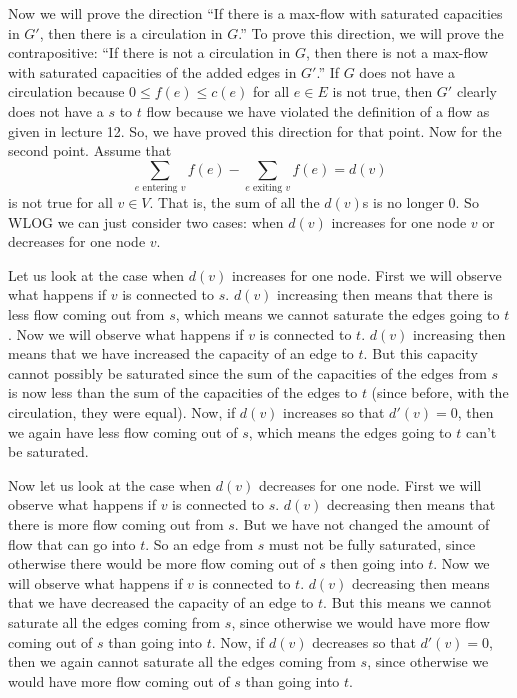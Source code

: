\documentclass{article}
\begin{document}
\begin{description}
        Now we will prove the direction ``If there is a max-flow with saturated
        capacities in $G'$,  then there is a circulation in $G$.'' To prove this
        direction, we will prove the contrapositive: ``If there is not a
        circulation in $G$, then there is not a max-flow with saturated
        capacities of the added edges in
        $G'$.'' If $G$ does not have a circulation because $0 \le f(e) \le c(e)$
        for all $e \in E$ is not true, then $G'$ clearly does not have a
        $s$ to $t$ flow because we have violated the definition of a flow as
        given in lecture 12. So, we have proved this direction for that
        point. Now for the second point. Assume that
        \[\sum_{e \mbox{ entering } v}f(e) - \sum_{e \mbox{ exiting } v}f(e)
        = d(v)\]
        is not true for all $v \in V$. That is, the sum of all the $d(v)$s is no
        longer 0. So WLOG we can just consider two cases: when $d(v)$ increases
        for one node $v$ or decreases for one node $v$.

        Let us look at the case
        when $d(v)$ increases for one node. First we will observe what happens
        if $v$ is connected to $s$. $d(v)$ increasing then means that there is
        less flow coming out from $s$, which means we cannot saturate the edges
        going to $t$. Now we will observe what happens if $v$ is connected to
        $t$. $d(v)$ increasing then means that we have increased the capacity of
        an edge to $t$. But this capacity cannot possibly be saturated since the
        sum of the capacities of the edges from $s$ is now less than the sum of
        the capacities of the edges to $t$ (since before, with the circulation,
        they were equal). Now, if $d(v)$ increases so that $d'(v) = 0$, then we
        again have less flow coming out of $s$, which means the edges going to
        $t$ can't be saturated.

        Now let us look at the case when $d(v)$ decreases for one node. First we
        will observe what happens if $v$ is connected to $s$. $d(v)$ decreasing
        then means that there is more flow coming out from $s$. But we have not
        changed the amount of flow that can go into $t$. So an edge from $s$
        must not be fully saturated, since otherwise there would be more flow
        coming out of $s$ then going into $t$. Now we will observe what happens
        if $v$ is connected to $t$. $d(v)$ decreasing then means that we have
        decreased the capacity of an edge to $t$. But this means we cannot
        saturate all the edges coming from $s$, since otherwise we would have
        more flow coming out of $s$ than going into $t$. Now, if $d(v)$
        decreases so that $d'(v) = 0$, then we again cannot saturate all the
        edges coming from $s$, since otherwise we would have more flow coming
        out of $s$ than going into $t$.


\end{description}
\end{document}
